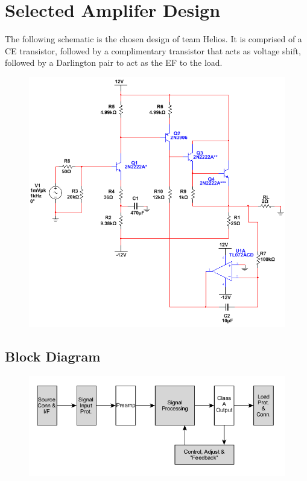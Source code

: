 \documentclass[journal]{IEEEtran}
\begin{document}
\section{Selected Amplifer Design}

The following schematic is the chosen design of team Helios. It is comprised of a CE transistor, followed by a complimentary transistor that acts as voltage shift, followed by a Darlington pair to act as the EF to the load.

\begin{figure}[H]
\centering
\includegraphics[scale=.4]{final-schem.png}
\label{fig_amp_schem}
\end{figure}

\subsection{Block Diagram}

\begin{figure}[H]
\centering
\includegraphics[scale=.38]{amp-block.png}
\label{fig_amp_block}
\end{figure}
\end{document}
